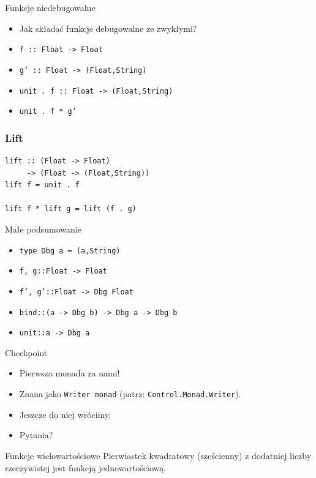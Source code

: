 \documentclass[14pt]{beamer}
\begin{document}
\begin{frame}{Funkcje niedebugowalne}
    \begin{itemize}
        \item Jak składać funkcje debugowalne ze zwykłymi?
        \item \texttt{f  :: Float -> Float}
        \item \texttt{g' :: Float -> (Float,String)}
        \pause
        \item \texttt{unit . f :: Float -> (Float,String)}
        \item \texttt{unit . f * g'}
    \end{itemize}
\end{frame}

\begin{frame}[fragile]
\frametitle{Lift}
\begin{verbatim}
lift :: (Float -> Float)
     -> (Float -> (Float,String))
lift f = unit . f

lift f * lift g = lift (f . g)
\end{verbatim}
\end{frame}

\begin{frame}{Małe podsumowanie}
    \begin{itemize}
        \item \texttt{type Dbg a = (a,String)}
        \item \texttt{f, g::Float -> Float}
        \item \texttt{f', g'::Float -> Dbg Float}
        \item \texttt{bind::(a -> Dbg b) -> Dbg a -> Dbg b}
        \item \texttt{unit::a -> Dbg a}
    \end{itemize}
\end{frame}

\begin{frame}{Checkpoint}
    \begin{itemize}
        \item Pierwsza monada za nami!
        \item Znana jako \texttt{Writer monad} (patrz: \texttt{Control.Monad.Writer}).
        \item Jeszcze do niej wrócimy.
        \pause
        \item Pytania?
    \end{itemize}
\end{frame}


\begin{frame}{Funkcje wielowartościowe}
    Pierwiastek kwadratowy (sześcienny) z dodatniej liczby rzeczywistej
    jest funkcją jednowartościową.
\end{frame}
\end{document}

